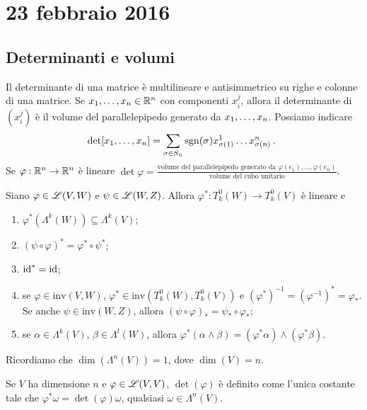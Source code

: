 \chapter{23 febbraio 2016}






\section{Determinanti e volumi}

Il determinante di una matrice è multilineare e antisimmetrico su righe e colonne di una matrice.
Se $\seqb xn, \in\R^n$ con componenti $x_i^j$, allora il determinante di $(x_i^j)$ è il volume del parallelepipedo generato da $\seqb xn,$.
Possiamo indicare
\begin{equation*}
	\det[\seqb xn,] = \sum_{\sigma\in S_n} \sgn(\sigma) x_{\sigma(1)}^1\ldots x_{\sigma(n)}^n \punto
\end{equation*}
Se $\varphi:\R^n\to\R^n$ è lineare $\det\varphi = \frac{\text{volume del parallelepipedo generato da $\varphi(e_1),\ldots,\varphi(e_n)$}}{\text{volume del cubo unitario}}$.

\begin{proposition}
	Siano $\varphi\in\Lin(V,W)$ e $\psi\in\Lin(W,Z)$. Allora $\varphi^* : T^0_k(W) \to T^0_k(V)$ è lineare e 
	\begin{enumerate}
		\item $\varphi^*(\Lambda^k(W)) \subseteq \Lambda^k(V)$;
		\item $(\psi\circ\varphi)^* = \varphi^* \circ \psi^*$;
		\item $\id^* = \id$;
		\item se $\varphi\in \mathrm{inv}(V,W)$, $\varphi^*\in \mathrm{inv}(T^0_k(W), T^0_k(V))$ e $(\varphi^*)^{-1} = (\varphi^{-1})^* = \varphi_*$.
		Se anche $\psi\in\mathrm{inv}(W,Z)$, allora $(\psi\circ\varphi)_* = \psi_*\circ \varphi_*$;
		\item se $\alpha\in\Lambda^k(V)$, $\beta\in\Lambda^l(W)$, allora $\varphi^*(\alpha\wedge\beta) = (\varphi^*\alpha) \wedge (\varphi^*\beta)$.
	\end{enumerate}
\end{proposition}

Ricordiamo che $\dim(\Lambda^n(V)) = 1$, dove $\dim(V)=n$.
\begin{definition}
	Se $V$ ha dimensione $n$ e $\varphi\in\Lin(V,V)$, $\det(\varphi)$ è definito come l'unica costante tale che $\varphi^*\omega = \det(\varphi) \omega$, qualsiasi $\omega\in\Lambda^n(V)$.
\end{definition}

